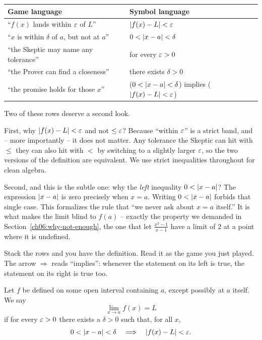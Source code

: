 \begin{center}
\renewcommand{\arraystretch}{1.5}
\begin{tabular}{@{}p{6.3cm}@{\quad$\Longleftrightarrow$\quad}p{6.1cm}@{}}
\toprule
\textbf{Game language} & \textbf{Symbol language} \\
\midrule
``$f(x)$ lands within $\varepsilon$ of $L$'' & $\lvert f(x) - L\rvert < \varepsilon$ \\
``$x$ is within $\delta$ of $a$, but not at $a$'' & $0 < \lvert x - a\rvert < \delta$ \\
``the Skeptic may name any tolerance'' & for every $\varepsilon > 0$ \\
``the Prover can find a closeness'' & there exists $\delta > 0$ \\
``the promise holds for those $x$'' & ($0<\lvert x-a\rvert<\delta$) implies ($\lvert f(x)-L\rvert<\varepsilon$) \\
\bottomrule
\end{tabular}
\end{center}

Two of these rows deserve a second look.

First, why $\lvert f(x)-L\rvert < \varepsilon$ and not $\le \varepsilon$? Because ``within
$\varepsilon$'' is a strict band, and -- more importantly -- it does not matter. Any
tolerance the Skeptic can hit with $\le$ they can also hit with $<$ by switching
to a slightly larger $\varepsilon$, so the two versions of the definition are
equivalent. We use strict inequalities throughout for clean algebra.

Second, and this is the subtle one: why the \emph{left} inequality
$0 < \lvert x-a\rvert$? The expression $\lvert x-a\rvert$ is zero precisely when $x = a$.
Writing $0 < \lvert x-a\rvert$ forbids that single case. This formalizes
the rule that ``we never ask about $x = a$ itself.'' It is what makes the limit blind to
$f(a)$ -- exactly the property we demanded in
Section~\ref{ch06:why-not-enough}, the one that let
$\frac{x^2-1}{x-1}$ have a limit of $2$ at a point where it is undefined.

Stack the rows and you have the definition. Read it as the game you just
played. The arrow $\Longrightarrow$ reads ``implies'': whenever the statement
on its left is true, the statement on its right is true too.

\begin{definition}
\label{ch06:def-limit}
Let $f$ be defined on some open interval containing $a$, except possibly at $a$
itself. We say
\[
  \lim_{x \to a} f(x) = L
\]
if for every $\varepsilon > 0$ there exists a $\delta > 0$ such that, for all $x$,
\[
  0 < \lvert x - a\rvert < \delta
  \quad\Longrightarrow\quad
  \lvert f(x) - L\rvert < \varepsilon.
\]
\end{definition}

